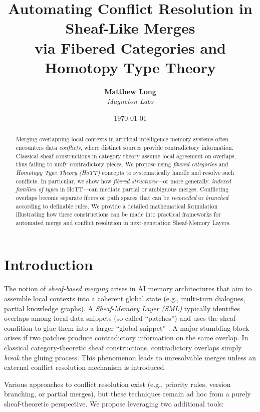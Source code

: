 \documentclass{article}
\title{%
Automating Conflict Resolution in Sheaf-Like Merges \\
via Fibered Categories and Homotopy Type Theory
}
\author{
  \textbf{Matthew Long}\\
  \textit{Magneton Labs}
}
\date{\today}
\begin{document}
\maketitle

\begin{abstract}
Merging overlapping local contexts in artificial intelligence memory systems often encounters data \emph{conflicts}, where distinct sources provide contradictory information. Classical sheaf constructions in category theory assume local agreement on overlaps, thus failing to unify contradictory pieces. We propose using \emph{fibered categories} and \emph{Homotopy Type Theory (HoTT)} concepts to systematically handle and resolve such conflicts. In particular, we show how \emph{fibered structures}—or more generally, \emph{indexed families of types} in HoTT—can mediate partial or ambiguous merges. Conflicting overlaps become separate fibers or path spaces that can be \emph{reconciled} or \emph{branched} according to definable rules. We provide a detailed mathematical formulation illustrating how these constructions can be made into practical frameworks for automated merge and conflict resolution in next-generation Sheaf-Memory Layers.
\end{abstract}

\tableofcontents

\section{Introduction}
\label{sec:introduction}

The notion of \emph{sheaf-based merging} arises in AI memory architectures that aim to assemble local contexts into a coherent global state (e.g., multi-turn dialogues, partial knowledge graphs). A \emph{Sheaf-Memory Layer (SML)} typically identifies overlaps among local data snippets (so-called ``patches'') and uses the sheaf condition to glue them into a larger ``global snippet'' \citep{toposMemory2025}. A major stumbling block arises if two patches produce contradictory information on the same overlap. In classical category-theoretic sheaf constructions, contradictory overlaps simply \emph{break} the gluing process. This phenomenon leads to unresolvable merges unless an external conflict resolution mechanism is introduced.

Various approaches to conflict resolution exist (e.g., priority rules, version branching, or partial merges), but these techniques remain ad hoc from a purely sheaf-theoretic perspective. We propose leveraging two additional tools:
\end{document}
